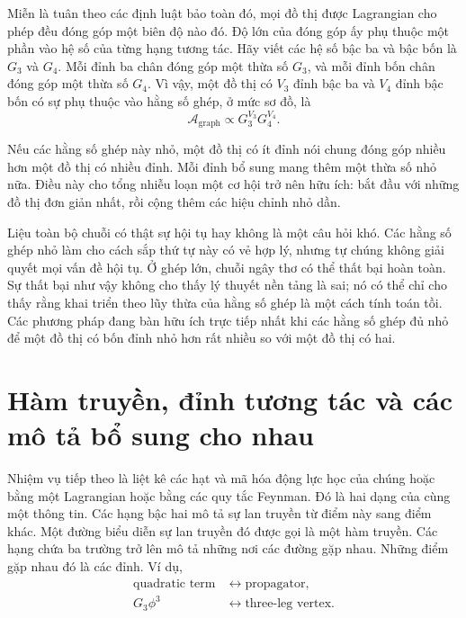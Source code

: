 Miễn là tuân theo các định luật bảo toàn đó, mọi đồ thị được Lagrangian cho phép đều đóng góp một biên độ nào đó. Độ lớn của đóng góp ấy phụ thuộc một phần vào hệ số của từng hạng tương tác. Hãy viết các hệ số bậc ba và bậc bốn là \(G_3\) và \(G_4\). Mỗi đỉnh ba chân đóng góp một thừa số \(G_3\), và mỗi đỉnh bốn chân đóng góp một thừa số \(G_4\). Vì vậy, một đồ thị có \(V_3\) đỉnh bậc ba và \(V_4\) đỉnh bậc bốn có sự phụ thuộc vào hằng số ghép, ở mức sơ đồ, là
\begin{equation}
\mathcal{A}_{\mathrm{graph}}
\propto G_3^{V_3}G_4^{V_4}.
\end{equation}

Nếu các hằng số ghép này nhỏ, một đồ thị có ít đỉnh nói chung đóng góp nhiều hơn một đồ thị có nhiều đỉnh. Mỗi đỉnh bổ sung mang thêm một thừa số nhỏ nữa. Điều này cho tổng nhiễu loạn một cơ hội trở nên hữu ích: bắt đầu với những đồ thị đơn giản nhất, rồi cộng thêm các hiệu chỉnh nhỏ dần.

Liệu toàn bộ chuỗi có thật sự hội tụ hay không là một câu hỏi khó. Các hằng số ghép nhỏ làm cho cách sắp thứ tự này có vẻ hợp lý, nhưng tự chúng không giải quyết mọi vấn đề hội tụ. Ở ghép lớn, chuỗi ngây thơ có thể thất bại hoàn toàn. Sự thất bại như vậy không cho thấy lý thuyết nền tảng là sai; nó có thể chỉ cho thấy rằng khai triển theo lũy thừa của hằng số ghép là một cách tính toán tồi. Các phương pháp đang bàn hữu ích trực tiếp nhất khi các hằng số ghép đủ nhỏ để một đồ thị có bốn đỉnh nhỏ hơn rất nhiều so với một đồ thị có hai.

\begin{classroomqa}
\end{classroomqa}

\section{Hàm truyền, đỉnh tương tác và các mô tả bổ sung cho nhau}

Nhiệm vụ tiếp theo là liệt kê các hạt và mã hóa động lực học của chúng hoặc bằng một Lagrangian hoặc bằng các quy tắc Feynman. Đó là hai dạng của cùng một thông tin. Các hạng bậc hai mô tả sự lan truyền từ điểm này sang điểm khác. Một đường biểu diễn sự lan truyền đó được gọi là một hàm truyền. Các hạng chứa ba trường trở lên mô tả những nơi các đường gặp nhau. Những điểm gặp nhau đó là các đỉnh. Ví dụ,
\begin{equation}
\begin{aligned}
\text{quadratic term}
&\longleftrightarrow \text{propagator},\\
G_3\phi^3
&\longleftrightarrow \text{three-leg vertex}.
\end{aligned}
\end{equation}

